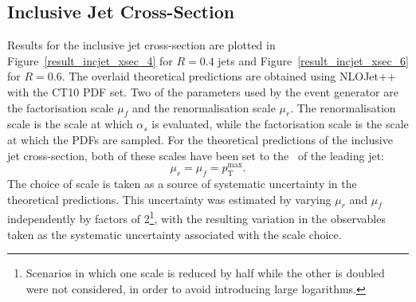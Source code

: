 \subsection{Inclusive Jet Cross-Section}
\label{incjet_results}


Results for the inclusive jet cross-section are plotted in Figure~\ref{result_incjet_xsec_4} for $R=0.4$ jets and Figure~\ref{result_incjet_xsec_6} for $R=0.6$. The overlaid theoretical predictions are obtained using NLOJet++ with the CT10 PDF set. Two of the parameters used by the event generator are the factorisation scale $\mu_f$ and the renormalisation scale $\mu_r$. The renormalisation scale is the scale at which $\alpha_s$ is evaluated, while the factorisation scale is the scale at which the PDFs are sampled. For the theoretical predictions of the inclusive jet cross-section, both of these scales have been set to the \pt~of the leading jet: 
\begin{equation}
\mu_r = \mu_f = p_\mathrm{T}^\mathrm{max}.
\label{bad_dijet_scale}
\end{equation}
The choice of scale is taken as a source of systematic uncertainty in the theoretical predictions. This uncertainty was estimated by varying $\mu_r$ and $\mu_f$ independently by factors of 2\footnote{Scenarios in which one scale is reduced by half while the other is doubled were not considered, in order to avoid introducing large logarithms.}, with the resulting variation in the observables taken as the systematic uncertainty associated with the scale choice.

